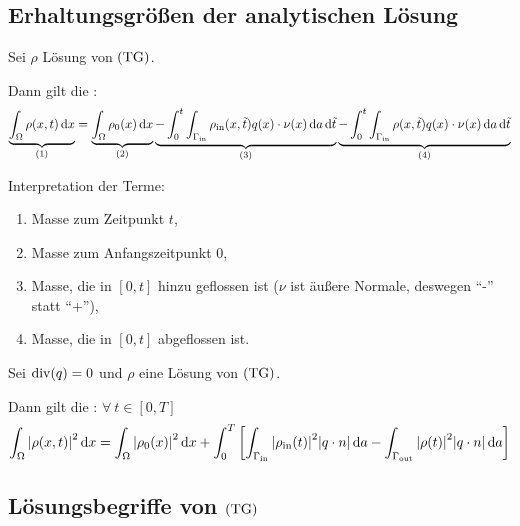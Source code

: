 \subsection{Erhaltungsgrößen der analytischen Lösung}
\label{subsec:Erhaltungsgroessen der analytischen Loesung}
\begin{Lemma}[Massenbilanz]
	\label{Massenbilanz}
	
	Sei $ \rho $ Lösung von $ \operatorname{(TG)} $. 
	
	Dann gilt die :
	\[ \underbrace{\int_{\Omega} \rho(x,t) \mathop{}\!\mathrm{d} x}_{(1)} = \underbrace{\int_{\Omega} \rho_0(x) \mathop{}\!\mathrm{d} x}_{(2)}  \underbrace{-\int_{0}^{t} \int_{\Gamma_{{\text{in}}}} \rho_{\text{in}}(x,\tilde{t}) q(x) \cdot \nu(x) \mathop{}\!\mathrm{d} a \mathop{}\!\mathrm{d} \tilde{t}}_{(3)} \underbrace{- \int_{0}^{t} \int_{\Gamma_{{\text{in}}}} \rho(x,\tilde{t}) q(x) \cdot \nu(x) \mathop{}\!\mathrm{d} a \mathop{}\!\mathrm{d} \tilde{t}}_{(4)} \]
\end{Lemma}
	Interpretation der Terme:
	\begin{enumerate}[label=(\arabic*)]
		\item Masse zum Zeitpunkt $ t $,
		\item Masse zum Anfangszeitpunkt $ 0 $,
		\item Masse, die in $ [0,t] $ hinzu geflossen ist ($ \nu $ ist äußere Normale, deswegen \enquote{-} statt \enquote{+}),
		\item Masse, die in $ [0,t] $ abgeflossen ist.
	\end{enumerate}

\begin{Lemma}[Energiebilanz]
	\label{Energiegleichung}
	
	Sei $ \operatorname{div}(q) = 0 $ und $ \rho $ eine Lösung von $ \operatorname{(TG)} $. 
	
	Dann gilt die : $ \forall \ t\in [0,T] $
	\[\int_{\Omega} \abs{\rho(x,t)}^2 \mathop{}\!\mathrm{d} x = \int_{\Omega} \abs{\rho_0(x)}^2 \mathop{}\!\mathrm{d} x  + \int_{0}^{T} \left[ \int_{\Gamma_{{\text{in}}}}\abs{\rho_{\text{in}}(t)}^2 \abs{q\cdot n} \mathop{}\!\mathrm{d} a - \int_{\Gamma_{{\text{out}}}} \abs{\rho(t)}^2 \abs{q\cdot n} \mathop{}\!\mathrm{d} a  \right] \]
\end{Lemma}

\subsection{Lösungsbegriffe von $ \operatorname{(TG)} $}

